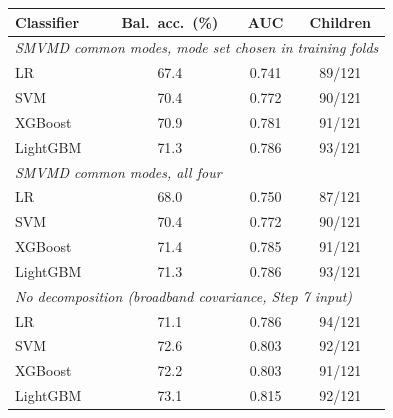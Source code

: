 \small
\begin{tabular}{lccc}
\hline
Classifier & Bal.\ acc.\ (\%) & AUC & Children \\
\hline
\multicolumn{4}{l}{\textit{SMVMD common modes, mode set chosen in training folds}} \\
\quad LR & 67.4 & 0.741 & 89/121 \\
\quad SVM & 70.4 & 0.772 & 90/121 \\
\quad XGBoost & 70.9 & 0.781 & 91/121 \\
\quad LightGBM & 71.3 & 0.786 & 93/121 \\
\multicolumn{4}{l}{\textit{SMVMD common modes, all four}} \\
\quad LR & 68.0 & 0.750 & 87/121 \\
\quad SVM & 70.4 & 0.772 & 90/121 \\
\quad XGBoost & 71.4 & 0.785 & 91/121 \\
\quad LightGBM & 71.3 & 0.786 & 93/121 \\
\multicolumn{4}{l}{\textit{No decomposition (broadband covariance, Step 7 input)}} \\
\quad LR & 71.1 & 0.786 & 94/121 \\
\quad SVM & 72.6 & 0.803 & 92/121 \\
\quad XGBoost & 72.2 & 0.803 & 91/121 \\
\quad LightGBM & 73.1 & 0.815 & 92/121 \\
\hline
\end{tabular}
